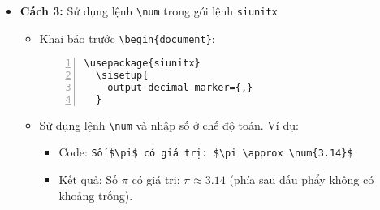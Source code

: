 \documentclass[12pt,a4paper]{article}
\begin{document}
\begin{itemize}
\item \textbf{Cách 3:} Sử dụng lệnh \Verb|\num| trong gói lệnh \Verb|siunitx|
\begin{itemize}
\item Khai báo trước \Verb|\begin{document}|:
\begin{Verbatim}[xleftmargin=10mm, numbers=left]
  \usepackage{siunitx}
  \sisetup{
    output-decimal-marker={,}
  }
\end{Verbatim}
\item Sử dụng lệnh \Verb|\num| và nhập số ở chế độ toán. Ví dụ:
\begin{itemize}
  \item Code: \Verb|Số $\pi$ có giá trị: $\pi \approx \num{3.14}$|

  \item Kết quả: Số $\pi$ có giá trị: $\pi \approx \num{3.14}$ (phía sau dấu phẩy không có khoảng trống).
\end{itemize}
\end{itemize}
\end{itemize}
\end{document}
